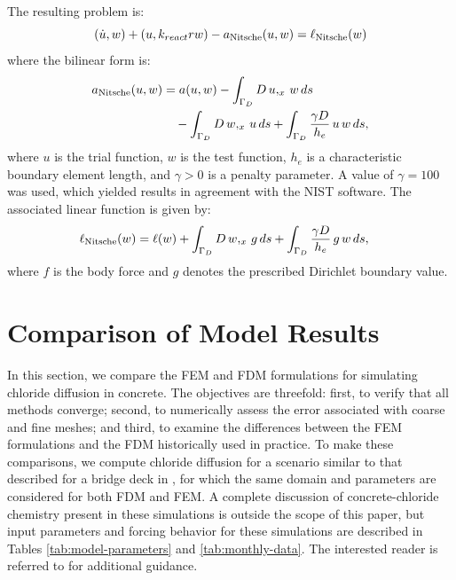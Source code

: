 \documentclass[conference]{IEEEtran}
\begin{document}
The resulting problem is:
%
\begin{equation}
 	(\dot{u},w) + (u,k_{react}rw) - a_{\rm Nitsche}(u,w) = \ell_{\rm Nitsche}(w)
\end{equation}
where the bilinear form is:
%
\begin{equation}
\begin{aligned}
a_{\rm Nitsche}(u,w)
&=
a(u,w) -
\int_{\Gamma_D}
D\, u,_x\, w \, ds\\
&\quad
-
\int_{\Gamma_D}
D\, w,_x\, u \, ds
+
\int_{\Gamma_D}
\frac{\gamma D}{h_e}\, u\, w \, ds,
\end{aligned}
\label{eq:nitsche-bilinear-reaction}
\end{equation}
where $u$ is the trial function, $w$ is the test function, $h_e$ is a
characteristic boundary element length, and $\gamma > 0$ is a penalty parameter. A value of $\gamma = 100$ was used, which yielded results in agreement with the NIST software.
The associated linear function is given by:
%
\begin{equation}
\begin{aligned}
\ell_{\rm Nitsche}(w)
&=
\ell(w) + 
\int_{\Gamma_D}
D\, w,_x\, g \, ds
+
\int_{\Gamma_D}
\frac{\gamma D}{h_e}\, g\, w \, ds,
\end{aligned}
\label{eq:nitsche-linear-reaction}
\end{equation}
where $f$ is the body force and $g$ denotes the prescribed Dirichlet boundary
value. 



\section{Comparison of Model Results}

In this section, we compare the FEM and FDM formulations for simulating chloride diffusion in concrete. 
The objectives are threefold: first, to verify that all methods converge; second, to numerically assess the error associated with coarse and fine meshes; and third, to examine the differences between the FEM formulations and the FDM historically used in practice.
To make these comparisons, we compute chloride diffusion for a scenario similar to that described for a bridge deck in \cite{b18}, for which the same domain and parameters are considered for both FDM and FEM.
A complete discussion of concrete-chloride chemistry present in these simulations is outside the scope of this paper, but input parameters and forcing behavior for these simulations are described in Tables \ref{tab:model-parameters} and \ref{tab:monthly-data}. 
The interested reader is referred to \cite{b19} for additional guidance.
\end{document}
